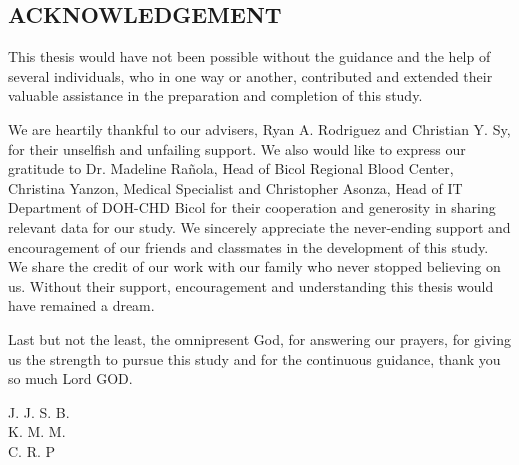 \begin{centering}
    \section{ACKNOWLEDGEMENT}
\end{centering}

This thesis would have not been possible without the guidance and the help of several individuals, who in one way or another, contributed and extended their valuable assistance in the preparation and completion of this study.

We are heartily thankful to our advisers, Ryan A. Rodriguez and Christian Y. Sy, for their unselfish and unfailing support.  We also would like to express our gratitude to Dr. Madeline Rañola,  Head of Bicol Regional Blood Center, Christina Yanzon, Medical Specialist and Christopher Asonza, Head of IT Department of DOH-CHD Bicol for their cooperation and generosity in sharing  relevant data for our study. We sincerely appreciate the never-ending support and encouragement of our friends and classmates in the development of this study. We share the credit of our work with our family who never stopped believing on us. Without their support, encouragement and understanding this thesis would have remained a dream.

Last but not the least, the omnipresent God, for answering our prayers, for giving us the strength to pursue this study and for the continuous guidance, thank you so much Lord GOD. 


\begin{flushright}
J. J. S. B. \\
K. M. M. \\
C. R. P
\end{flushright}



